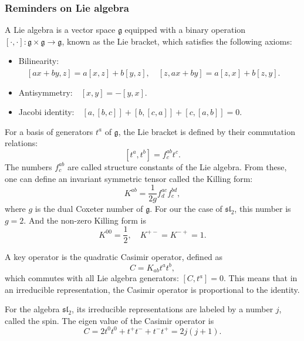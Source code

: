 \documentclass[10pt,a4paper]{article}
\numberwithin{equation}{section}
\begin{document}
\subsubsection*{Reminders on Lie algebra}
A Lie algebra is a vector space $\mathfrak{g}$ equipped with a binary operation $\left[\cdot,\cdot \right]:\mathfrak{g}\times \mathfrak{g} \rightarrow \mathfrak{g}$,
known as the Lie bracket, which satisfies the following axioms:
\begin{itemize}
    \item Bilinearity:$\quad \left[ax+by,z \right] = a \left[x,z\right] + b \left[y,z\right],\quad \left[z,ax+by \right] = a \left[z,x\right] + b \left[z,y\right]$.
    \item Antisymmetry:$\quad \left[x,y\right] = - \left[y,x\right]$.
    \item Jacobi identity:$\quad \left[a,\left[b,c\right]\right]+\left[b,\left[c,a\right]\right]+\left[c,\left[a,b\right]\right] = 0$.
\end{itemize}
For a basis of generators $t^{a}$ of $\mathfrak{g}$, the Lie bracket is defined by their commutation relations:
\begin{equation}
    \left[t^{a},t^{b}\right] = f^{ab}_{c} t^{c}.
\end{equation}
The numbers $f^{ab}_{c}$ are called structure constants of the Lie algebra. From these, one can define an invariant symmetric tensor 
called the Killing form: 
\begin{equation}
    K^{ab} = \frac{1}{2g} f^{ac}_{d}f^{bd}_{c},
\end{equation}
where $g$ is the dual Coxeter number of $\mathfrak{g}$. For our the case of $\mathfrak{sl}_{2}$, this number is $g = 2$. And the non-zero Killing form is 
\begin{equation}
    K^{00} = \frac{1}{2}, \quad K^{+-} = K^{-+} = 1.
\end{equation}

A key operator is the quadratic Casimir operator, defined as  
\begin{equation}
    C = K_{ab} t^{a} t^{b},
\end{equation}
which commutes with all Lie algebra generators: $\left[C,t^{a}\right] = 0$. This means that in an irreducible representation, 
the Casimir operator is proportional to the identity. 

For the algebra $\mathfrak{sl}_{2}$, its irreducible representations are labeled by a number $j$, called the spin. 
The eigen value of the Casimir operator is 
\begin{equation}
    C = 2 t^{0} t^{0} + t^{+} t^{-} + t^{-} t^{+} = 2j(j+1).
\end{equation}
\end{document}
